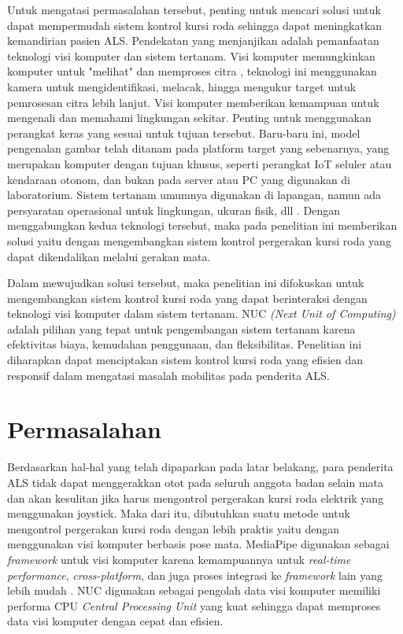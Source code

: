 Untuk mengatasi permasalahan tersebut, penting untuk mencari solusi untuk dapat mempermudah sistem kontrol kursi roda sehingga dapat meningkatkan kemandirian pasien ALS. Pendekatan yang menjanjikan adalah pemanfaatan teknologi visi komputer dan sistem tertanam. Visi komputer memungkinkan komputer untuk "melihat" dan memproses citra \parencite{TIAN20201}, teknologi ini menggunakan kamera untuk mengidentifikasi, melacak, hingga mengukur target untuk pemrosesan citra lebih lanjut. Visi komputer memberikan kemampuan untuk mengenali dan memahami lingkungan sekitar. Penting untuk menggunakan perangkat keras yang sesuai untuk tujuan tersebut. Baru-baru ini, model pengenalan gambar telah ditanam pada platform target yang sebenarnya, yang merupakan komputer dengan tujuan khusus, seperti perangkat IoT seluler atau kendaraan otonom, dan bukan pada server atau PC yang digunakan di laboratorium. Sistem tertanam umumnya digunakan di lapangan, namun ada persyaratan operasional untuk lingkungan, ukuran fisik, dll \parencite{8939843}. Dengan menggabungkan kedua teknologi tersebut, maka pada penelitian ini memberikan solusi yaitu dengan mengembangkan sistem kontrol pergerakan kursi roda yang dapat dikendalikan melalui gerakan mata.

Dalam mewujudkan solusi tersebut, maka penelitian ini difokuskan untuk mengembangkan sistem kontrol kursi roda yang dapat berinteraksi dengan teknologi visi komputer dalam sistem tertanam. NUC \textit{(Next Unit of Computing)} adalah pilihan yang tepat untuk pengembangan sistem tertanam karena efektivitas biaya, kemudahan penggunaan, dan fleksibilitas. Penelitian ini diharapkan dapat menciptakan sistem kontrol kursi roda yang efisien dan responsif dalam mengatasi masalah mobilitas pada penderita ALS.

\section{Permasalahan}
\label{sec:permasalahan}

Berdasarkan hal-hal yang telah dipaparkan pada latar belakang, para penderita ALS tidak dapat menggerakkan otot pada seluruh anggota badan selain mata dan akan kesulitan jika harus mengontrol pergerakan kursi roda elektrik yang menggunakan joystick. Maka dari itu, dibutuhkan suatu metode untuk mengontrol pergerakan kursi roda dengan lebih praktis yaitu dengan menggunakan visi komputer berbasis pose mata. MediaPipe digunakan sebagai \textit{framework} untuk visi komputer karena kemampuannya untuk \textit{real-time performance}, \textit{cross-platform}, dan juga proses integrasi ke \textit{framework} lain yang lebih mudah \parencite{lugaresi2019mediapipe}. NUC digunakan sebagai pengolah data visi komputer memiliki performa CPU \emph{Central Processing Unit} yang kuat sehingga dapat memproses data visi komputer dengan cepat dan efisien.

